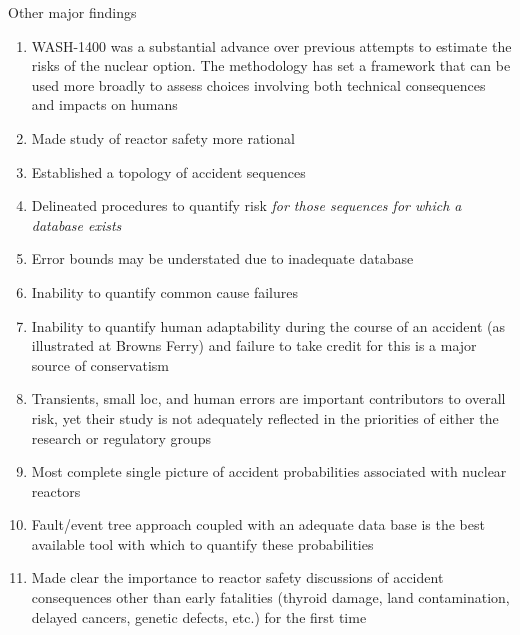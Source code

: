 \documentclass[aspectratio=1610,pdftex,dvipsnames,compress,xcolor={dvipsnames}]{beamer}
\newcommand{\acs}{\acrshort} %
\begin{document}
\addtocounter{framenumber}{-1}
\begin{frame}{Other major findings}
    \small
    \begin{enumerate}[series=wash,topsep=0pt,itemsep=0pt,leftmargin=*,label=(\arabic*)]
        \item WASH-1400 was a substantial advance over previous attempts to estimate the risks of the nuclear option. The methodology has set a framework that can be used more broadly to assess choices involving both technical consequences and impacts on humans
        \item Made study of reactor safety more rational
        \item Established a topology of accident sequences
        \item Delineated procedures to quantify risk \textit{for those sequences for which a database exists}
        \item Error bounds may be understated due to inadequate database
        \item Inability to quantify common cause failures
        \item Inability to quantify human adaptability during the course of an accident (as illustrated at Browns Ferry) and failure to take credit for this is a major source of conservatism
        \item Transients, small \acs{loc}, and human errors are important contributors to overall risk, yet their study is not adequately reflected in the priorities of either the research or regulatory groups
        \item Most complete single picture of accident probabilities associated with nuclear reactors
        \item Fault/event tree approach coupled with an adequate data base is the best available tool with which to quantify these probabilities
        \item Made clear the importance to reactor safety discussions of accident consequences other than early fatalities (thyroid damage, land contamination, delayed cancers, genetic defects, etc.) for the first time
    \end{enumerate}
\end{frame}
\end{document}
